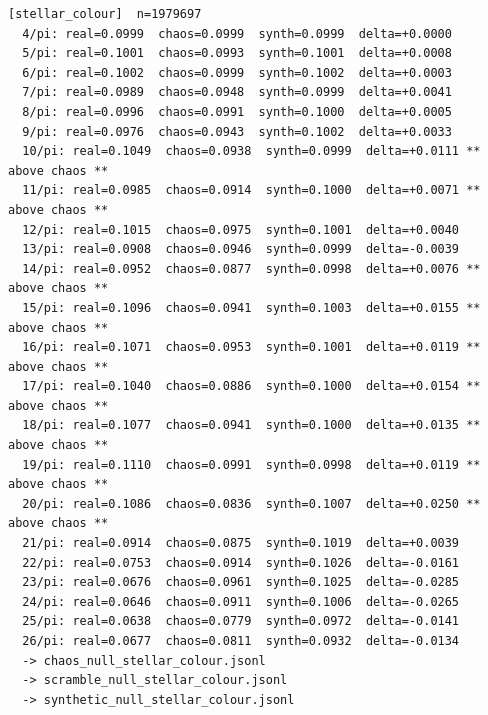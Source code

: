\documentclass[11pt, letterpaper, openany]{book}
\begin{document}
\begin{empiricalbox}
\begin{lstlisting}[style=terminal]
[stellar_colour]  n=1979697
  4/pi: real=0.0999  chaos=0.0999  synth=0.0999  delta=+0.0000
  5/pi: real=0.1001  chaos=0.0993  synth=0.1001  delta=+0.0008
  6/pi: real=0.1002  chaos=0.0999  synth=0.1002  delta=+0.0003
  7/pi: real=0.0989  chaos=0.0948  synth=0.0999  delta=+0.0041
  8/pi: real=0.0996  chaos=0.0991  synth=0.1000  delta=+0.0005
  9/pi: real=0.0976  chaos=0.0943  synth=0.1002  delta=+0.0033
  10/pi: real=0.1049  chaos=0.0938  synth=0.0999  delta=+0.0111 ** above chaos **
  11/pi: real=0.0985  chaos=0.0914  synth=0.1000  delta=+0.0071 ** above chaos **
  12/pi: real=0.1015  chaos=0.0975  synth=0.1001  delta=+0.0040
  13/pi: real=0.0908  chaos=0.0946  synth=0.0999  delta=-0.0039
  14/pi: real=0.0952  chaos=0.0877  synth=0.0998  delta=+0.0076 ** above chaos **
  15/pi: real=0.1096  chaos=0.0941  synth=0.1003  delta=+0.0155 ** above chaos **
  16/pi: real=0.1071  chaos=0.0953  synth=0.1001  delta=+0.0119 ** above chaos **
  17/pi: real=0.1040  chaos=0.0886  synth=0.1000  delta=+0.0154 ** above chaos **
  18/pi: real=0.1077  chaos=0.0941  synth=0.1000  delta=+0.0135 ** above chaos **
  19/pi: real=0.1110  chaos=0.0991  synth=0.0998  delta=+0.0119 ** above chaos **
  20/pi: real=0.1086  chaos=0.0836  synth=0.1007  delta=+0.0250 ** above chaos **
  21/pi: real=0.0914  chaos=0.0875  synth=0.1019  delta=+0.0039
  22/pi: real=0.0753  chaos=0.0914  synth=0.1026  delta=-0.0161
  23/pi: real=0.0676  chaos=0.0961  synth=0.1025  delta=-0.0285
  24/pi: real=0.0646  chaos=0.0911  synth=0.1006  delta=-0.0265
  25/pi: real=0.0638  chaos=0.0779  synth=0.0972  delta=-0.0141
  26/pi: real=0.0677  chaos=0.0811  synth=0.0932  delta=-0.0134
  -> chaos_null_stellar_colour.jsonl
  -> scramble_null_stellar_colour.jsonl
  -> synthetic_null_stellar_colour.jsonl


\end{lstlisting}
\end{empiricalbox}
\end{document}
